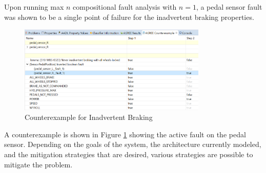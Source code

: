 Upon running max $n$ compositional fault analysis with $n = 1$, a pedal sensor fault was shown to be a single point of failure for the inadvertent braking properties. 
\begin{figure}[htbp]
	\begin{center}
		\includegraphics[width=0.8\textwidth]{images/counterexample.png}
	\end{center}
	\vspace{-0.3in}
	\caption{Counterexample for Inadvertent Braking}
	\label{fig:counterexample}
\end{figure} 
A counterexample is shown in Figure \ref{fig:counterexample} showing the active fault on the pedal sensor. Depending on the goals of the system, the architecture currently modeled, and the mitigation strategies that are desired, various strategies are possible to mitigate the problem.

